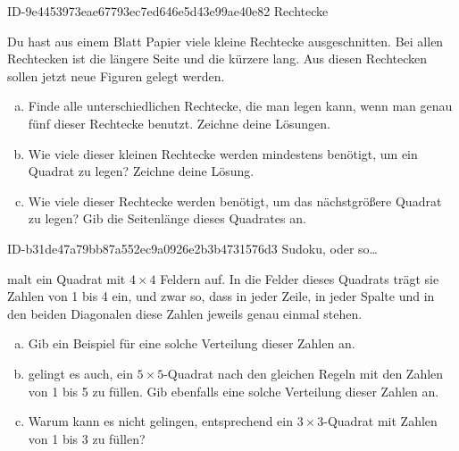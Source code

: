 \begin{exercise}
      {ID-9e4453973eae67793ec7ed646e5d43e99ae40e82}
      {Rechtecke}
  \ifproblem\problem\par
    Du hast aus einem Blatt Papier viele kleine
    Rechtecke ausgeschnitten. Bei allen Rechtecken
    ist die längere Seite  und die kürzere
     lang. Aus diesen Rechtecken sollen
    jetzt neue Figuren gelegt werden.
    \begin{enumerate}[a)]
      \item Finde alle unterschiedlichen Rechtecke,
            die man legen kann, wenn man genau fünf
            dieser Rechtecke benutzt. Zeichne deine
            Lösungen.
      \item Wie viele dieser kleinen Rechtecke
            werden mindestens benötigt, um ein
            Quadrat zu legen? Zeichne deine Lösung.
      \item Wie viele dieser Rechtecke werden
            benötigt, um das nächstgrößere Quadrat
            zu legen? Gib die Seitenlänge dieses
            Quadrates an.
    \end{enumerate}
  \fi
\end{exercise}

\begin{exercise}
      {ID-b31de47a79bb87a552ec9a0926e2b3b4731576d3}
      {Sudoku, oder so\ldots}
  \ifproblem\problem\par
    \xxa{} malt ein Quadrat mit $4\times4$ Feldern
    auf. In die Felder dieses Quadrats trägt sie
    Zahlen von 1 bis 4 ein, und zwar so, dass in
    jeder Zeile, in jeder Spalte und in den beiden
    Diagonalen diese Zahlen jeweils genau einmal
    stehen.
    \begin{enumerate}[a)]
      \item Gib ein Beispiel für eine solche
            Verteilung dieser Zahlen an.
      \item \xxa{} gelingt es auch, ein
            $5\times5$-Quadrat nach den gleichen
            Regeln mit den Zahlen von 1 bis 5 zu
            füllen. Gib ebenfalls eine solche
            Verteilung dieser Zahlen an.
      \item Warum kann es \xxa{} nicht gelingen,
            entsprechend ein $3\times3$-Quadrat
            mit Zahlen von 1 bis 3 zu füllen?
    \end{enumerate}
  \fi
\end{exercise}


